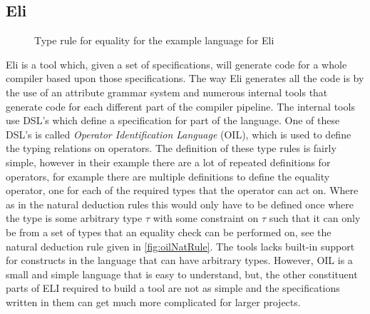 \subsection{Eli}
\begin{figure}[]
    \centering
    \begin{prooftree}
    \end{prooftree}
    \caption{Type rule for equality for the example language for Eli}
    \label{fig:oilNatRule}
\end{figure}
Eli is a tool which, given a set of specifications, will generate code for a whole compiler based upon those specifications\cite{Gray:1992:ECF:129630.129637}.
The way Eli generates all the code is by the use of an attribute grammar system and numerous internal tools that generate code for each different part of the compiler pipeline.
The internal tools use DSL's which define a specification for part of the language.
One of these DSL's is called \textit{Operator Identification Language} (OIL), which is used to define the typing relations on operators.
The definition of these type rules is fairly simple, however in their example there are a lot of repeated definitions for operators, for example there are multiple definitions to define the equality operator, one for each of the required types that the operator can act on.
Where as in the natural deduction rules this would only have to be defined once where the type is some arbitrary type $\tau$  with some constraint on $\tau$ such that it can only be from a set of types that an equality check can be performed on, see the natural deduction rule given in \autoref{fig:oilNatRule}.
The tools lacks built-in support for constructs in the language that can have arbitrary types.
However, OIL is a small and simple language that is easy to understand, but, the other constituent parts of ELI required to build a tool are not as simple and the specifications written in them can get much more complicated for larger projects.

